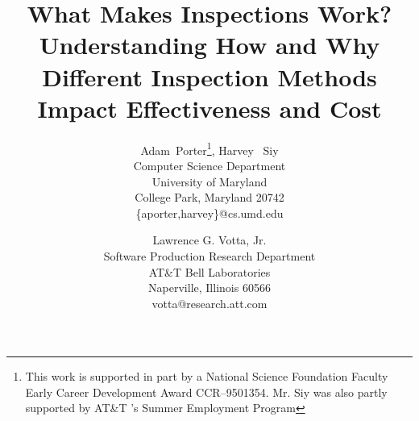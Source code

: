 %
%





\title {What Makes Inspections Work? Understanding How and Why Different 
Inspection Methods Impact Effectiveness and Cost}

\author{Adam~Porter\thanks{ This work is supported in part by a National Science Foundation Faculty Early Career Development Award CCR--9501354. Mr. Siy was also partly supported by AT\&T 's Summer Employment Program}, Harvey ~Siy\\
Computer Science Department\\
University of Maryland\\
College Park, Maryland 20742\\
\{aporter,harvey\}@cs.umd.edu\\
\and
Lawrence G. Votta, Jr.\\
Software Production Research Department\\
AT\&T Bell Laboratories \\
Naperville, Illinois 60566 \\
votta@research.att.com\\
}

\maketitle
\thispagestyle{empty}

\begin{abstract}


\end{abstract}



